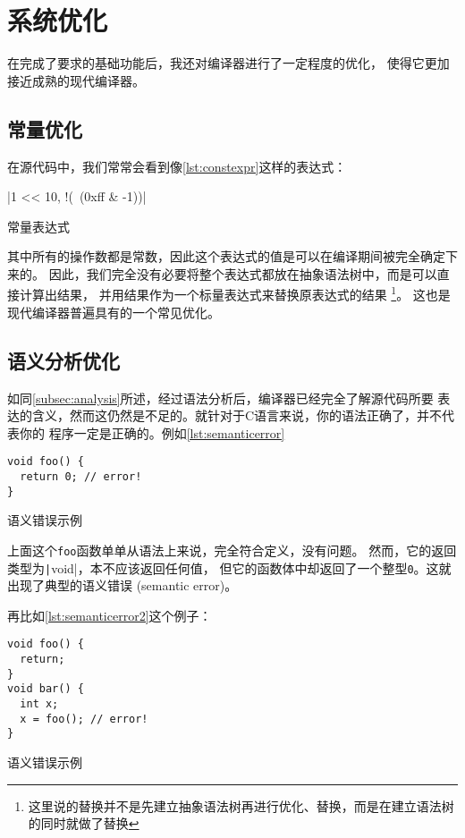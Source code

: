 \section{系统优化}\label{sec:optim}

在完成了要求的基础功能后，我还对编译器进行了一定程度的优化，
使得它更加接近成熟的现代编译器。

\subsection{常量优化}

在源代码中，我们常常会看到像\autoref{lst:constexpr}这样的表达式：

\begin{listing}[hbt]
|1 << 10, !(~(0xff & -1))|
\caption{常量表达式}\label{lst:constexpr}
\end{listing}

其中所有的操作数都是常数，因此这个表达式的值是可以在编译期间被完全确定下来的。
因此，我们完全没有必要将整个表达式都放在抽象语法树中，而是可以直接计算出结果，
并用结果作为一个标量表达式来替换原表达式的结果%
\footnote{这里说的替换并不是先建立抽象语法树再进行优化、替换，而是在建立语法树的同时就做了替换}。
这也是现代编译器普遍具有的一个常见优化\cite{appel2004modern,aho1986compilers,Advanced-compiler-optim}。

\subsection{语义分析优化}\label{subsec:semantic}

如同\autoref{subsec:analysis}所述，经过语法分析后，编译器已经完全了解源代码所要
表达的含义，然而这仍然是不足的。就针对于C语言来说，你的语法正确了，并不代表你的
程序一定是正确的。例如\autoref{lst:semanticerror}

\begin{listing}[hbt]
\begin{verbatim}
void foo() {
  return 0; // error!
}
\end{verbatim}
\caption{语义错误示例}\label{lst:semanticerror}
\end{listing}

上面这个{\tt foo}函数单单从语法上来说，完全符合定义，没有问题。
然而，它的返回类型为\texttt|void|，本不应该返回任何值，
但它的函数体中却返回了一个整型{\tt 0}。这就出现了典型的语义错误 (semantic error)。

再比如\autoref{lst:semanticerror2}这个例子：
\begin{listing}[hbt]
\begin{verbatim}
void foo() {
  return;
}
void bar() {
  int x;
  x = foo(); // error!
}
\end{verbatim}
\caption{语义错误示例}\label{lst:semanticerror2}
\end{listing}

